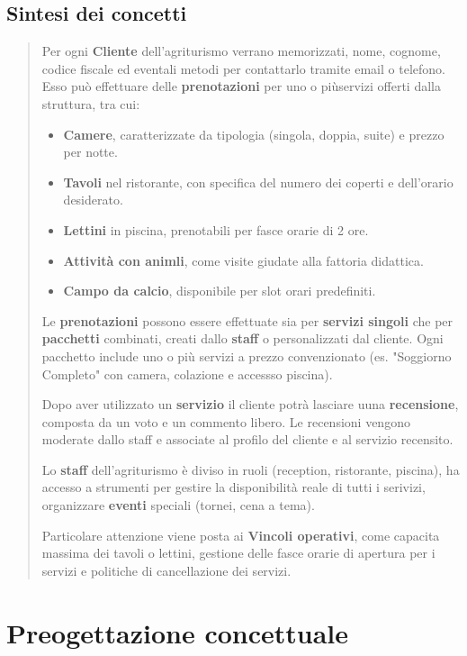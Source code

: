 \documentclass[a4paper,11pt]{report}
\begin{document}
\section{Sintesi dei concetti}
\begin{quote}
    Per ogni \textbf{Cliente} dell'agriturismo verrano memorizzati, nome, cognome, codice fiscale ed eventali metodi per contattarlo tramite email o telefono. Esso
    può effettuare delle \textbf{prenotazioni} per uno o piùservizi offerti dalla struttura, tra cui:
    \begin{itemize}
        \item \textbf{Camere}, caratterizzate da tipologia (singola, doppia, suite) e prezzo per notte.
        \item \textbf{Tavoli} nel ristorante, con specifica del numero dei coperti e dell'orario desiderato.
        \item \textbf{Lettini} in piscina, prenotabili per fasce orarie di 2 ore.
        \item \textbf{Attività con animli}, come visite giudate alla fattoria didattica.
        \item \textbf{Campo da calcio}, disponibile per slot orari predefiniti.
    \end{itemize}
    Le \textbf{prenotazioni} possono essere effettuate sia per \textbf{servizi singoli} che per \textbf{pacchetti} combinati, creati dallo \textbf{staff} o personalizzati
    dal cliente. Ogni pacchetto include uno o più servizi a prezzo convenzionato (es. "Soggiorno Completo" con camera, colazione e accessso piscina).

    Dopo aver utilizzato un \textbf{servizio} il cliente potrà lasciare uuna \textbf{recensione}, composta da un voto e un commento libero. Le recensioni
    vengono moderate dallo staff e associate al profilo del cliente e al servizio recensito.

    Lo \textbf{staff} dell'agriturismo è diviso in ruoli (reception, ristorante, piscina), ha accesso a strumenti per gestire la disponibilità reale di tutti i serivizi,
    organizzare \textbf{eventi} speciali (tornei, cena a tema).

    Particolare attenzione viene posta ai \textbf{Vincoli operativi}, come capacita massima dei tavoli o lettini, gestione delle fasce orarie di apertura per i servizi e
    politiche di cancellazione dei servizi.
\end{quote}

\chapter{Preogettazione concettuale}
\end{document}
